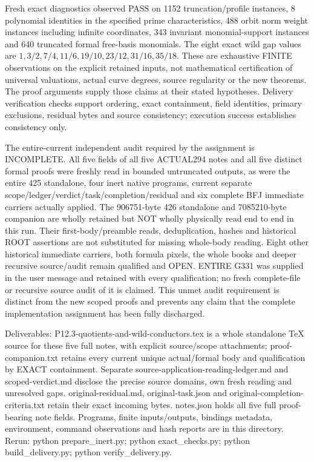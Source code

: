 Fresh exact diagnostics observed PASS on 1152 truncation/profile instances,
8 polynomial identities in the specified prime characteristics, 488 orbit
norm weight instances including infinite coordinates, 343 invariant
monomial-support instances and 640 truncated formal free-basis monomials.
The eight exact wild gap values are $1,3/2,7/4,11/6,19/10,23/12,31/16,35/18$.
These are exhaustive FINITE observations on the explicit retained inputs,
not mathematical certification of universal valuations, actual curve degrees,
source regularity or the new theorems. The proof arguments supply those
claims at their stated hypotheses. Delivery verification checks support
ordering, exact containment, field identities, primary exclusions, residual
bytes and source consistency; execution success establishes consistency only.

The entire-current independent audit required by the assignment is
INCOMPLETE. All five fields of all five ACTUAL294 notes and all five
distinct formal proofs were freshly read in bounded untruncated outputs,
as were the entire 425 standalone, four inert native programs, current
separate scope/ledger/verdict/task/completion/residual and six complete
BFJ immediate carriers actually applied. The 906751-byte 426 standalone
and 7085210-byte companion are wholly retained but NOT wholly physically
read end to end in this run. Their first-body/preamble reads, deduplication,
hashes and historical ROOT assertions are not substituted for missing
whole-body reading. Eight other historical immediate carriers, both
formula pixels, the whole books and deeper recursive source/audit remain
qualified and OPEN. ENTIRE G331 was supplied in the user message and
retained with every qualification; no fresh complete-file or recursive
source audit of it is claimed. This unmet audit requirement is distinct
from the new scoped proofs and prevents any claim that the complete
implementation assignment has been fully discharged.

Deliverables: P12.3-quotients-and-wild-conductors.tex is a whole standalone
TeX source for these five full notes, with explicit source/scope attachments;
proof-companion.txt retains every current unique actual/formal body and
qualification by EXACT containment. Separate source-application-reading-ledger.md
and scoped-verdict.md disclose the precise source domains, own fresh
reading and unresolved gaps. original-residual.md, original-task.json and
original-completion-criteria.txt retain their exact incoming bytes.
notes.json holds all five full proof-bearing note fields. Programs, finite
inputs/outputs, bindings metadata, environment, command observations and
hash reports are in this directory. Rerun: python prepare\_inert.py;
python exact\_checks.py; python build\_delivery.py; python verify\_delivery.py.

